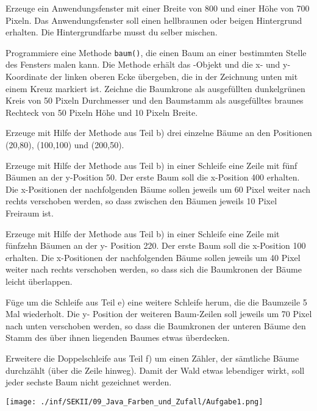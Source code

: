 \begin{compactenum}[a)]
\item Erzeuge ein Anwendungsfenster mit einer Breite von 800 und einer Höhe von
700 Pixeln. Das Anwendungsfenster soll einen hellbraunen oder beigen
Hintergrund erhalten. Die Hintergrundfarbe musst du selber mischen.
\item Programmiere eine Methode \lstinline|baum()|, die einen Baum an einer
bestimmten Stelle des Fensters malen kann. Die Methode erhält das
-Objekt und die x- und y-Koordinate der linken oberen Ecke
übergeben, die in der Zeichnung unten mit einem Kreuz markiert ist. Zeichne die
Baumkrone als ausgefüllten dunkelgrünen Kreis von 50 Pixeln Durchmesser und den
Baumstamm als ausgefülltes braunes Rechteck von 50 Pixeln Höhe und 10 Pixeln
Breite.
\item Erzeuge mit Hilfe der Methode aus Teil b) drei einzelne Bäume an den
 Positionen (20,80), (100,100) und (200,50).
\item Erzeuge mit Hilfe der Methode aus Teil b) in einer Schleife eine Zeile mit
fünf Bäumen an der y-Position 50. Der erste Baum soll die x-Position 400
erhalten. Die x-Positionen der nachfolgenden Bäume sollen jeweils um 60 Pixel
weiter nach rechts verschoben werden, so dass zwischen den Bäumen jeweils 10
Pixel Freiraum ist.
\item Erzeuge mit Hilfe der Methode aus Teil b) in einer Schleife eine Zeile mit
fünfzehn Bäumen an der y- Position 220. Der erste Baum soll die x-Position 100
erhalten. Die x-Positionen der nachfolgenden Bäume sollen jeweils um 40 Pixel
weiter nach rechts verschoben werden, so dass sich die Baumkronen der Bäume
leicht überlappen.
\item Füge um die Schleife aus Teil e) eine weitere Schleife herum, die die
Baumzeile 5 Mal wiederholt. Die y- Position der weiteren Baum-Zeilen soll
jeweils um 70 Pixel nach unten verschoben werden, so dass die Baumkronen der
unteren Bäume den Stamm des über ihnen liegenden Baumes etwas überdecken.
\item Erweitere die Doppelschleife aus Teil f) um einen Zähler, der sämtliche
Bäume durchzählt (über die Zeile hinweg). Damit der Wald etwas lebendiger
wirkt, soll jeder sechste Baum nicht gezeichnet werden.
\end{compactenum}

\begin{center}
\texttt{[image: ./inf/SEKII/09\_Java\_Farben\_und\_Zufall/Aufgabe1.png]}
\end{center}


